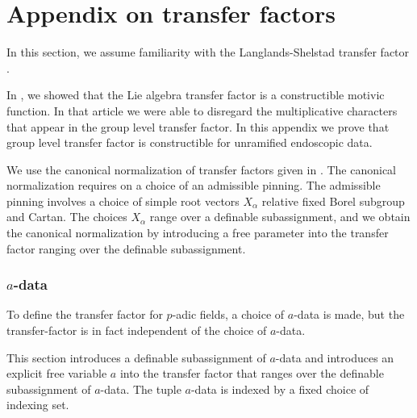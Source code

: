 \section{Appendix on transfer factors}

In this section, we assume familiarity with the Langlands-Shelstad transfer factor \cite{langlands1987definition}.

In \cite{gordon}, we showed that the Lie algebra transfer factor is a constructible motivic function.  
In that article we were able to disregard the multiplicative characters that appear in the group level transfer factor.
In this appendix we prove that group level transfer factor is constructible for unramified endoscopic data.

We use the canonical normalization of transfer factors given in \cite[\S7]{hales1993simple}.  
The canonical normalization requires
on a choice of an admissible pinning.  
The admissible pinning involves a choice of simple root vectors $X_\alpha$ 
relative fixed Borel subgroup and Cartan.
The choices $X_\alpha$ range over a definable subassignment, 
and we obtain the canonical normalization by introducing a free
parameter into the transfer factor ranging over the definable subassignment.

\subsubsection{$a$-data}

To define the transfer factor for $p$-adic  fields, a choice of $a$-data is made, but the transfer-factor is in fact independent of the choice of $a$-data.

This section introduces a definable subassignment of $a$-data and introduces an explicit free variable $a$ into the transfer factor that ranges over
the definable subassignment of $a$-data.  The tuple $a$-data is indexed by a fixed choice of indexing set.  

